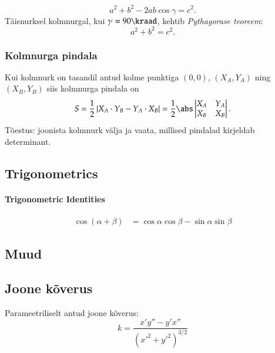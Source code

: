 \documentclass[a4paper]{article}
\numberwithin{equation}{subsection}
\begin{document}
\begin{equation}
a^2 + b^2 - 2ab \cos \gamma = c^2.
\end{equation}
Täisnurksel kolmnurgal, kui $\gamma = 90\kraad$, kehtib
\emph{Pythagorase teoreem}:
\begin{equation}
a^2 + b^2 = c^2.
\end{equation}

\subsubsection{Kolmnurga pindala}
Kui kolmnurk on tasandil antud kolme punktiga $(0,0)$, $(X_A, Y_A)$
ning $(X_B, Y_B)$ siis kolmnurga pindala on
\begin{equation}
S = \frac{1}{2} \left| X_A \cdot Y_B - Y_A \cdot X_B \right| =
\frac{1}{2} \abs
  \begin{vmatrix}
  X_A   & Y_A \\
  X_B   & X_B
  \end{vmatrix}.
\end{equation}
Tõestus: joonista kolmnurk välja ja vaata, millised pindalad kirjeldab
determinant.



\subsection{Trigonometrics}
\label{sec:trigonometrics}

\paragraph{Trigonometric Identities}

\begin{align*}
  \cos(\alpha + \beta) &= \cos\alpha \cos\beta - \sin\alpha \sin\beta
\end{align*}

\subsection{Muud}
\label{sec:geomeetria_muud}


\subsection{Joone kõverus}

Parameetriliselt antud joone kõverus:
\begin{equation}
  \label{eq:param_joone_kqverus}
  k = \frac{x'y'' - y'x''}{({x'}^2 + {y'}^2)^{3/2}}
\end{equation}
\end{document}

